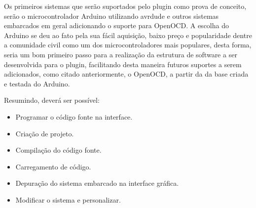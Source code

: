 Os primeiros sistemas que serão suportados pelo plugin como prova de conceito, serão o microcontrolador Arduino utilizando avrdude e outros sistemas embarcados em geral adicionando o suporte para OpenOCD. A escolha do Arduino se deu ao fato pela sua fácil aquisição, baixo preço e popularidade dentre a comunidade civil como um dos microcontroladores mais populares, desta forma, seria um bom primeiro passo para a realização da estrutura de software a ser desenvolvida para o plugin, facilitando desta maneira futuros suportes a serem adicionados, como citado anteriormente, o OpenOCD, a partir da da base criada e testada do Arduino.

Resumindo, deverá ser possível:
\begin{itemize}
\item Programar o código fonte na interface.	
\item Criação de projeto.
\item Compilação do código fonte.
\item Carregamento de código.
\item Depuração do sistema embarcado na interface gráfica.
\item Modificar o sistema e personalizar.
\end{itemize}

